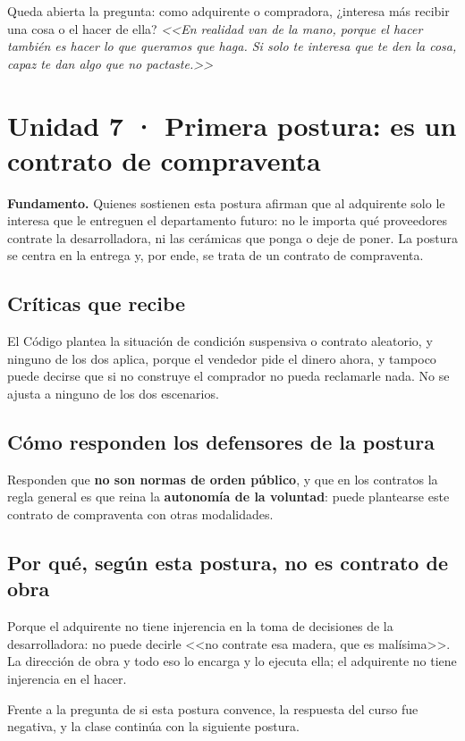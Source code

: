 \documentclass[12pt,oneside]{book}
\begin{document}
Queda abierta la pregunta: como adquirente o compradora, ¿interesa más recibir una cosa o el hacer de ella? \textit{<<En realidad van de la mano, porque el hacer también es hacer lo que queramos que haga. Si solo te interesa que te den la cosa, capaz te dan algo que no pactaste.>>}

\section{Unidad 7 · Primera postura: es un contrato de compraventa}

\textbf{Fundamento.} Quienes sostienen esta postura afirman que al adquirente solo le interesa que le entreguen el departamento futuro: no le importa qué proveedores contrate la desarrolladora, ni las cerámicas que ponga o deje de poner. La postura se centra en la entrega y, por ende, se trata de un contrato de compraventa.

\subsection{Críticas que recibe}

El Código plantea la situación de condición suspensiva o contrato aleatorio, y ninguno de los dos aplica, porque el vendedor pide el dinero ahora, y tampoco puede decirse que si no construye el comprador no pueda reclamarle nada. No se ajusta a ninguno de los dos escenarios.

\subsection{Cómo responden los defensores de la postura}

Responden que \textbf{no son normas de orden público}, y que en los contratos la regla general es que reina la \textbf{autonomía de la voluntad}: puede plantearse este contrato de compraventa con otras modalidades.

\subsection{Por qué, según esta postura, no es contrato de obra}

Porque el adquirente no tiene injerencia en la toma de decisiones de la desarrolladora: no puede decirle <<no contrate esa madera, que es malísima>>. La dirección de obra y todo eso lo encarga y lo ejecuta ella; el adquirente no tiene injerencia en el hacer.

Frente a la pregunta de si esta postura convence, la respuesta del curso fue negativa, y la clase continúa con la siguiente postura.
\end{document}
